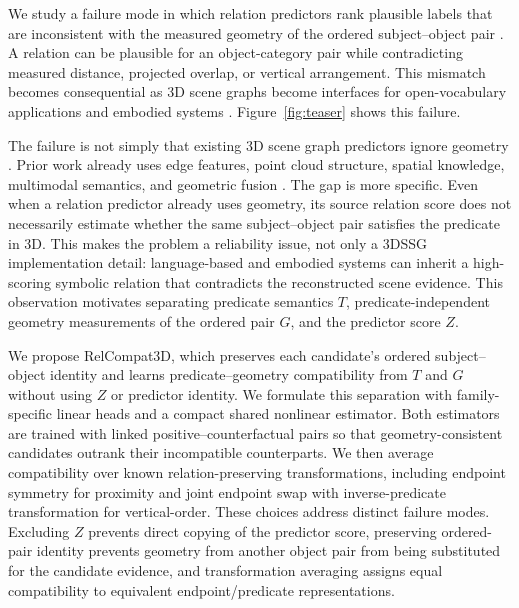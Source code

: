 \documentclass[letterpaper]{article}
\begin{document}
We study a failure mode in which relation predictors rank plausible labels that are inconsistent with the measured geometry of the ordered subject--object pair \cite{nguyen2026relwitness,neau2026visual}. A relation can be plausible for an object-category pair while contradicting measured distance, projected overlap, or vertical arrangement. This mismatch becomes consequential as 3D scene graphs become interfaces for open-vocabulary applications and embodied systems \cite{koch2024open3dsg,hou2025fross,zhang2025open,wang2025open,saxena2025zing,fei2026open,madhavaram2026vizor}. Figure~\ref{fig:teaser} shows this failure.

The failure is not simply that existing 3D scene graph predictors ignore geometry \cite{wald2020learning}. Prior work already uses edge features, point cloud structure, spatial knowledge, multimodal semantics, and geometric fusion \cite{zhang2021exploiting,feng20233d,wang2023vl,koch2024sgrec3d,chen2024clip}. The gap is more specific. Even when a relation predictor already uses geometry, its source relation score does not necessarily estimate whether the same subject--object pair satisfies the predicate in 3D. This makes the problem a reliability issue, not only a 3DSSG implementation detail: language-based and embodied systems can inherit a high-scoring symbolic relation that contradicts the reconstructed scene evidence. This observation motivates separating predicate semantics $T$, predicate-independent geometry measurements of the ordered pair $G$, and the predictor score $Z$.

We propose RelCompat3D, which preserves each candidate's ordered subject--object identity and learns predicate--geometry compatibility from $T$ and $G$ without using $Z$ or predictor identity. We formulate this separation with family-specific linear heads and a compact shared nonlinear estimator. Both estimators are trained with linked positive--counterfactual pairs so that geometry-consistent candidates outrank their incompatible counterparts. We then average compatibility over known relation-preserving transformations, including endpoint symmetry for proximity and joint endpoint swap with inverse-predicate transformation for vertical-order. These choices address distinct failure modes. Excluding $Z$ prevents direct copying of the predictor score, preserving ordered-pair identity prevents geometry from another object pair from being substituted for the candidate evidence, and transformation averaging assigns equal compatibility to equivalent endpoint/predicate representations.
\end{document}
